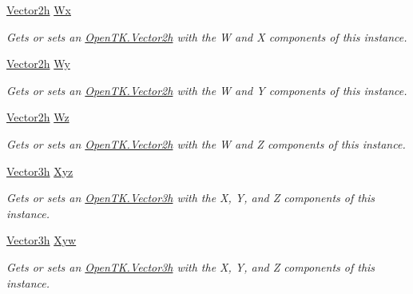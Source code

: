 \begin{DoxyCompactItemize}
\hyperlink{struct_open_t_k_1_1_vector2h}{Vector2h} \hyperlink{struct_open_t_k_1_1_vector4h_a7ec34caec68e8ebeb92b6971dcc84803}{Wx}
\begin{DoxyCompactList}\small\item\em Gets or sets an \hyperlink{struct_open_t_k_1_1_vector2h}{Open\-T\-K.\-Vector2h} with the W and X components of this instance. \end{DoxyCompactList}\item 
\hyperlink{struct_open_t_k_1_1_vector2h}{Vector2h} \hyperlink{struct_open_t_k_1_1_vector4h_a750c6f6a4c382dc92f395c2ea1aae72f}{Wy}
\begin{DoxyCompactList}\small\item\em Gets or sets an \hyperlink{struct_open_t_k_1_1_vector2h}{Open\-T\-K.\-Vector2h} with the W and Y components of this instance. \end{DoxyCompactList}\item 
\hyperlink{struct_open_t_k_1_1_vector2h}{Vector2h} \hyperlink{struct_open_t_k_1_1_vector4h_a806035c5cd250ddabef878a7e534f744}{Wz}
\begin{DoxyCompactList}\small\item\em Gets or sets an \hyperlink{struct_open_t_k_1_1_vector2h}{Open\-T\-K.\-Vector2h} with the W and Z components of this instance. \end{DoxyCompactList}\item 
\hyperlink{struct_open_t_k_1_1_vector3h}{Vector3h} \hyperlink{struct_open_t_k_1_1_vector4h_a5a6bb3771030dbf1d53ed8e4b31653c8}{Xyz}
\begin{DoxyCompactList}\small\item\em Gets or sets an \hyperlink{struct_open_t_k_1_1_vector3h}{Open\-T\-K.\-Vector3h} with the X, Y, and Z components of this instance. \end{DoxyCompactList}\item 
\hyperlink{struct_open_t_k_1_1_vector3h}{Vector3h} \hyperlink{struct_open_t_k_1_1_vector4h_aa7eb6db0dab25664135033c0d606dee9}{Xyw}
\begin{DoxyCompactList}\small\item\em Gets or sets an \hyperlink{struct_open_t_k_1_1_vector3h}{Open\-T\-K.\-Vector3h} with the X, Y, and Z components of this instance. \end{DoxyCompactList}\item 

\end{DoxyCompactItemize}
